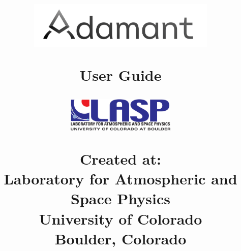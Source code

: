 

\usepackage[colorlinks = true,
            linkcolor = black,
            urlcolor  = black,
            citecolor = black,
            anchorcolor = black]{hyperref}
\usepackage[titletoc]{appendix}

\usepackage{setspace}
\usepackage{etoolbox}
\usepackage{wrapfig}

\makeatletter
\newcommand\HUGE{\@setfontsize\Huge{38}{47}}
\makeatother 



\title{
\begin{figure}[H]
  \includegraphics[width=0.8\textwidth,center]{../logos/adamant_logo_text_black.png}
\end{figure}
\vspace{-10mm}
\Huge{User Guide} \\
\vspace{110mm}
\begin{figure}[H]
  \includegraphics[width=0.46\textwidth,center]{images/lasp.png}
\end{figure}
\vspace{3mm} %
\small{Created at:} \\
\small{Laboratory for Atmospheric and Space Physics} \\
\small{University of Colorado}  \\
\small{Boulder, Colorado} \\
}
\author{}

\date{}
\maketitle
\thispagestyle{empty}
\newpage

\tableofcontents


